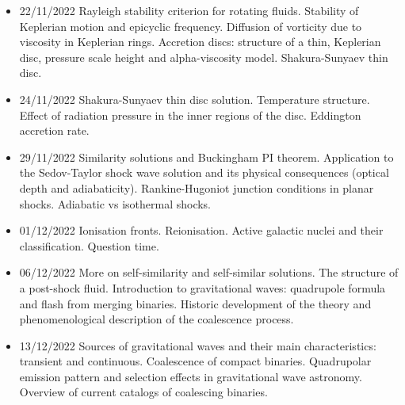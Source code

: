\begin{itemize}
    \item 22/11/2022 Rayleigh stability criterion for rotating fluids. Stability of Keplerian motion and epicyclic frequency. Diffusion of vorticity due to viscosity in Keplerian rings. Accretion discs: structure of a thin, Keplerian disc, pressure scale height and alpha-viscosity model. Shakura-Sunyaev thin disc. 
    \item 24/11/2022 Shakura-Sunyaev thin disc solution. Temperature structure. Effect of radiation pressure in the inner regions of the disc. Eddington accretion rate. 
    \item 29/11/2022 Similarity solutions and Buckingham PI theorem. Application to the Sedov-Taylor shock wave solution and its physical consequences (optical depth and adiabaticity). Rankine-Hugoniot junction conditions in planar shocks. Adiabatic vs isothermal shocks. 
    \item 01/12/2022 Ionisation fronts. Reionisation. Active galactic nuclei and their classification. Question time. 
    \item 06/12/2022 More on self-similarity and self-similar solutions. The structure of a post-shock fluid. Introduction to gravitational waves: quadrupole formula and flash from merging binaries. Historic development of the theory and phenomenological description of the coalescence process. 
    \item 13/12/2022 Sources of gravitational waves and their main characteristics: transient and continuous. Coalescence of compact binaries. Quadrupolar emission pattern and selection effects in gravitational wave astronomy. Overview of current catalogs of coalescing binaries. 
\end{itemize}